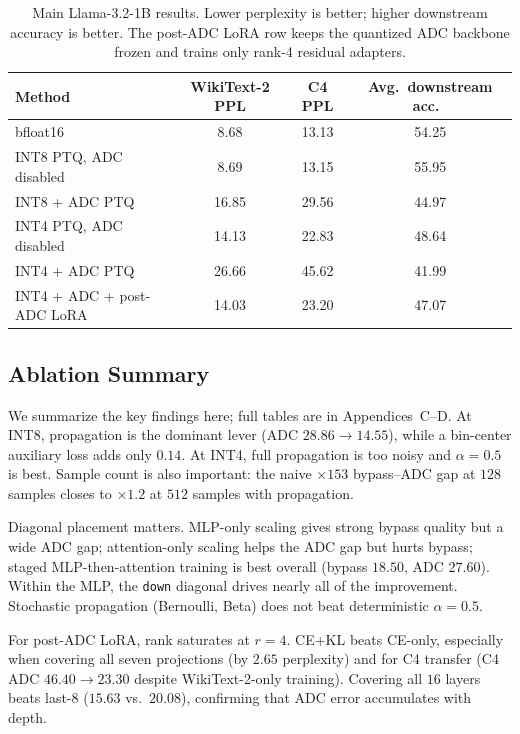 \documentclass[letterpaper]{article} %
\theoremstyle{plain}
\begin{document}
\begin{table}[t]
\centering
\begin{tabular}{l|ccc}
\toprule
Method & WikiText-2 PPL & C4 PPL & Avg.\ downstream acc.\ \\
\midrule
bfloat16 & 8.68 & 13.13 & 54.25 \\
INT8 PTQ, ADC disabled & 8.69 & 13.15 & 55.95 \\
INT8 + ADC PTQ & 16.85 & 29.56 & 44.97 \\
INT4 PTQ, ADC disabled & 14.13 & 22.83 & 48.64 \\
INT4 + ADC PTQ & 26.66 & 45.62 & 41.99 \\
INT4 + ADC + post-ADC LoRA & 14.03 & 23.20 & 47.07 \\
\bottomrule
\end{tabular}
\caption{Main Llama-3.2-1B results. Lower perplexity is better; higher downstream accuracy is better. The post-ADC LoRA row keeps the quantized ADC backbone frozen and trains only rank-4 residual adapters.}
\label{tab:main}
\end{table}

\subsection{Ablation Summary}

We summarize the key findings here; full tables are in Appendices~C--D. At INT8, propagation is the dominant lever (ADC $28.86 \to 14.55$), while a bin-center auxiliary loss adds only $0.14$. At INT4, full propagation is too noisy and $\alpha = 0.5$ is best. Sample count is also important: the naive $\times 153$ bypass--ADC gap at $128$ samples closes to $\times 1.2$ at $512$ samples with propagation.

Diagonal placement matters. MLP-only scaling gives strong bypass quality but a wide ADC gap; attention-only scaling helps the ADC gap but hurts bypass; staged MLP-then-attention training is best overall (bypass $18.50$, ADC $27.60$). Within the MLP, the \texttt{down} diagonal drives nearly all of the improvement. Stochastic propagation (Bernoulli, Beta) does not beat deterministic $\alpha=0.5$.

For post-ADC LoRA, rank saturates at $r=4$. CE+KL beats CE-only, especially when covering all seven projections (by $2.65$ perplexity) and for C4 transfer (C4 ADC $46.40 \to 23.30$ despite WikiText-2-only training). Covering all $16$ layers beats last-$8$ ($15.63$ vs.\ $20.08$), confirming that ADC error accumulates with depth.
\end{document}
